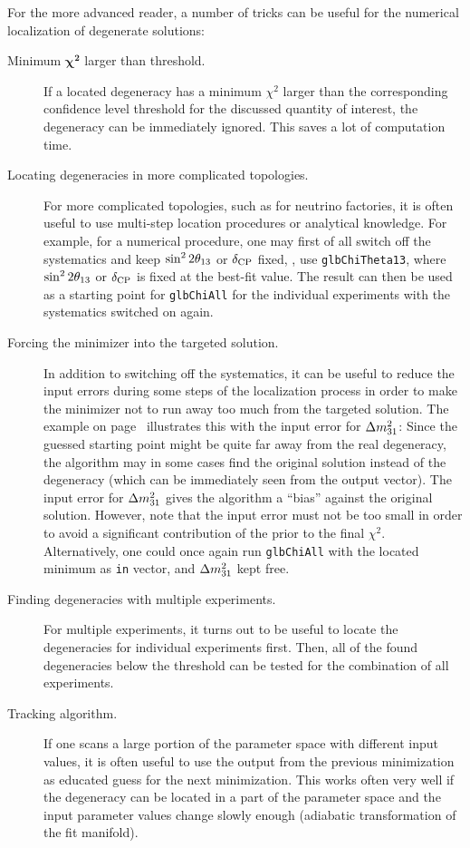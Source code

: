 For the more advanced reader, a number of tricks can be useful for the numerical localization of degenerate solutions:
\begin{description}
\item[Minimum $\boldsymbol{\chi^2}$ larger than threshold.] If a located degeneracy has a minimum $\chi^2$ larger than the corresponding confidence level threshold for the discussed quantity of interest, the degeneracy can be immediately ignored. This saves a lot of computation time.
\item[Locating degeneracies in more complicated topologies.] For more complicated topologies, such as for neutrino factories, it is often useful to use multi-step location procedures or analytical knowledge. For example, for a numerical procedure, one may first of all switch off the systematics and keep $\sin^2 2 \theta_{13}$ or $\delta_{\mathrm{CP}}$ fixed, \ie, use {\tt glbChiTheta13}, where $\sin^2 2 \theta_{13}$ or $\delta_{\mathrm{CP}}$ is fixed at the best-fit value. The result can then be used as a starting point for {\tt glbChiAll} for the individual experiments with the systematics switched on again. 
\item[Forcing the minimizer into the targeted solution.]
In addition to switching off the systematics, it can be useful to reduce the input errors during some steps of the localization process in order to make the minimizer not to run away too much from the targeted solution.
The example on page~\pageref{ex:sgndeg} illustrates this with the
input error for $\Delta m_{31}^2$: Since the guessed starting point might be
quite far away from the real degeneracy, the algorithm may in some cases
find the original solution instead of the degeneracy (which can
be immediately seen from the output vector). The input error
for $\Delta m_{31}^2$ gives the algorithm a ``bias'' against the original solution.
However, note that the input error must not be too small in order
to avoid a significant contribution of the prior to the final $\chi^2$.
Alternatively, one could once again run {\tt glbChiAll} with the located 
minimum as {\tt in} vector, and $\Delta m_{31}^2$ kept free.
\item[Finding degeneracies with multiple experiments.] For multiple experiments, it turns out to be useful to locate the degeneracies for individual experiments first. Then, all of the found degeneracies below the threshold can be tested for the combination of all experiments.
\item[Tracking algorithm.] If one scans a large portion of the parameter space with different input values, it is often useful to use the output from the previous minimization as educated guess for the next minimization. This works often very well if the degeneracy can be located in a part of the parameter space and the input parameter values change slowly enough (adiabatic transformation of the fit manifold). 

\end{description}
